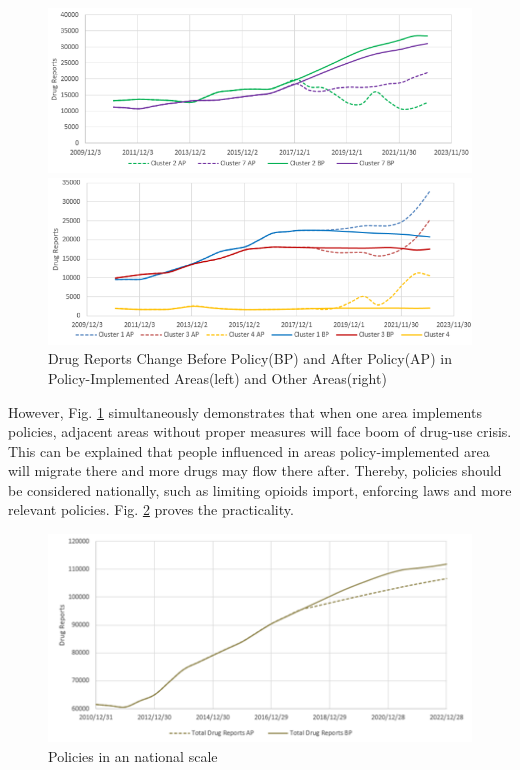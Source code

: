 \documentclass[12pt]{article}
\begin{document}
\begin{figure}[H]
	\centering %
	\begin{minipage}[b]{0.48\textwidth} %
		\centering %
		\includegraphics[scale=0.68]{./figures/13.png} %
	\end{minipage}
	\begin{minipage}[b]{0.48\textwidth} %
		\centering %
		\includegraphics[scale=0.68]{./figures/14.png}%
	\end{minipage}
	\caption{Drug Reports Change Before Policy(BP) and After Policy(AP) in Policy-Implemented Areas(left) and Other Areas(right)}
	\label{Fig14}
\end{figure}

However, Fig. \ref{Fig14} simultaneously demonstrates that when one area implements policies, adjacent areas without proper measures will face boom of drug-use crisis. This can be explained that people influenced in areas policy-implemented area will migrate there and more drugs may flow there after. Thereby, policies should be considered nationally, such as limiting opioids import, enforcing laws and more relevant policies. Fig. \ref{Fig16} proves the practicality.

\begin{figure}[H]
	\centering
	\includegraphics[scale=0.9]{./figures/16.png}
	\caption{Policies in an national scale}
	\label{Fig16}
\end{figure}
\end{document}
